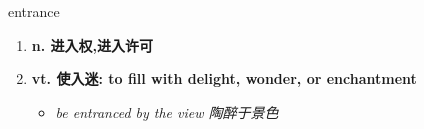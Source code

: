 
\begin{frame}
{\huge entrance}
\begin{center}
\begin{enumerate}\Large
  \item \textbf{n. 进入权,进入许可}
  \item \textbf{vt. 使入迷: to fill with delight, wonder, or enchantment}
  \begin{itemize}
    \item \em{\Large{be entranced by the view 陶醉于景色}}
  \end{itemize}
\end{enumerate}
\end{center}
\end{frame}
